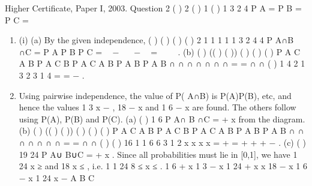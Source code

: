 \documentclass[a4paper,12pt]{article}
\begin{document}
Higher Certificate, Paper I, 2003. Question 2
( ) 2 ( ) 1 ( ) 1
3 2 4
P A = P B = P C =
\begin{enumerate}
\item (i) (a) By the given independence,
( ) ( ) ( ) ( ) 2 1 1 1 1 1
3 2 4 4
P A∩B ∩C = P A P B P C =  −  −  =
  
.
(b) ( ) (( ) ( ))
( )
( )
( )
P A C A B P A C B
P A C A B
P A B P A B
∩ ∩ ∩ ∩ ∩
∩ ∩ = =
∩ ∩
( )
1
4
2 1
3 2
3
1 4
= =
−
.
\item 
Using pairwise independence, the value of P( A∩B) is P(A)P(B), etc, and
hence the values 1
3 x − , 18
− x and 1
6 − x are found. The others follow using
P(A), P(B) and P(C).
(a) ( ) 1
6
P A∩ B ∩C = + x from the diagram.
(b) ( ) (( ) ( ))
( )
( )
( )
P A C A B P A C B
P A C A B
P A B P A B
∩ ∩ ∩ ∩ ∩
∩ ∩ = =
∩ ∩
( ) ( )
16
1 1
6 6
3 1
2
x x
x x
= + = +
+ + −
.
(c) ( ) 19
24
P A∪ B∪C = + x .
Since all probabilities must lie in [0,1], we have 1
24 x ≥ and 18
x ≤ , i.e.
1 1
24 8
≤ x ≤ .
1
6 + x 1
3 − x 1
24 + x
x 18
− x 1
6 − x
1
24 x −
A B
C
\end{enumerate}
\end{document}
